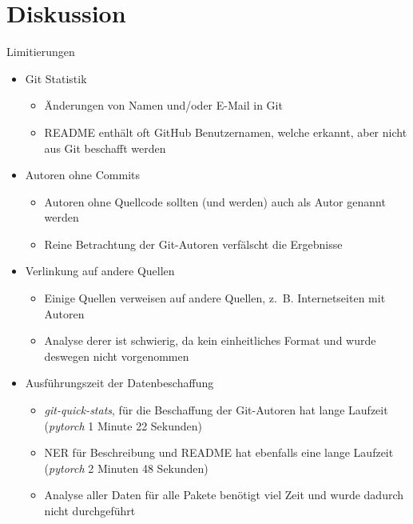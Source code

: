 \documentclass[%
    handout,
    aspectratio=1610,
    10pt,
    onlytextwidth, %
]{beamer}
\begin{document}
\section{Diskussion}

\begin{frame}{Limitierungen}
    \begin{itemize}
        \item Git Statistik
        \begin{itemize}
            \item Änderungen von Namen und/oder E-Mail in Git %
            \item README enthält oft GitHub Benutzernamen, welche erkannt, aber nicht aus Git beschafft werden
        \end{itemize}
        \item Autoren ohne Commits
        \begin{itemize}
            \item Autoren ohne Quellcode sollten (und werden) auch als Autor genannt werden
            \item Reine Betrachtung der Git-Autoren verfälscht die Ergebnisse
        \end{itemize}
        \item Verlinkung auf andere Quellen
        \begin{itemize}
            \item Einige Quellen verweisen auf andere Quellen, z.~B. Internetseiten mit Autoren
            \item Analyse derer ist schwierig, da kein einheitliches Format und wurde deswegen nicht vorgenommen
        \end{itemize}
        \item Ausführungszeit der Datenbeschaffung
        \begin{itemize}
            \item \emph{git-quick-stats}, für die Beschaffung der Git-Autoren hat lange Laufzeit (\emph{pytorch} 1 Minute 22 Sekunden)
            \item NER für Beschreibung und README hat ebenfalls eine lange Laufzeit (\emph{pytorch} 2 Minuten 48 Sekunden)
            \item Analyse aller Daten für alle Pakete benötigt viel Zeit und wurde dadurch nicht durchgeführt
        \end{itemize}
    \end{itemize}
\end{frame}
\end{document}
